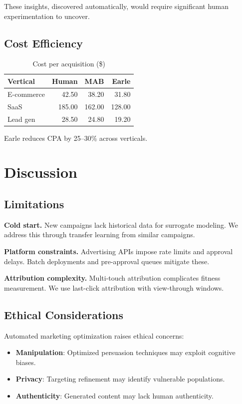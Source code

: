 \documentclass[11pt,twocolumn]{article}
\begin{document}
These insights, discovered automatically, would require significant human experimentation to uncover.

\subsection{Cost Efficiency}

\begin{table}[h]
\centering
\caption{Cost per acquisition (\$)}
\label{tab:cpa}
\begin{tabular}{lrrr}
\hline
Vertical & Human & MAB & Earle \\
\hline
E-commerce & 42.50 & 38.20 & 31.80 \\
SaaS & 185.00 & 162.00 & 128.00 \\
Lead gen & 28.50 & 24.80 & 19.20 \\
\hline
\end{tabular}
\end{table}

Earle reduces CPA by 25--30\% across verticals.

\section{Discussion}

\subsection{Limitations}

\textbf{Cold start.} New campaigns lack historical data for surrogate modeling. We address this through transfer learning from similar campaigns.

\textbf{Platform constraints.} Advertising APIs impose rate limits and approval delays. Batch deployments and pre-approval queues mitigate these.

\textbf{Attribution complexity.} Multi-touch attribution complicates fitness measurement. We use last-click attribution with view-through windows.

\subsection{Ethical Considerations}

Automated marketing optimization raises ethical concerns:

\begin{itemize}
\item \textbf{Manipulation}: Optimized persuasion techniques may exploit cognitive biases.
\item \textbf{Privacy}: Targeting refinement may identify vulnerable populations.
\item \textbf{Authenticity}: Generated content may lack human authenticity.
\end{itemize}
\end{document}
